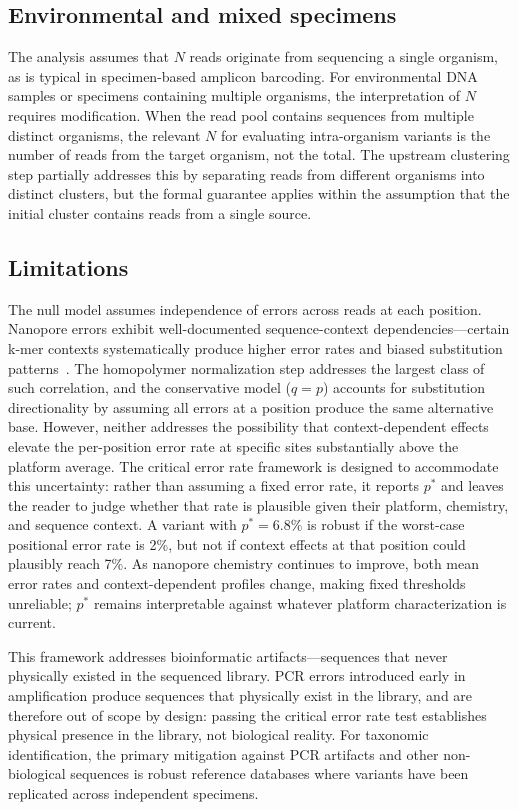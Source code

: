 \documentclass[11pt]{article}
\begin{document}
\subsection{Environmental and mixed specimens}

The analysis assumes that $N$ reads originate from sequencing a single organism,
as is typical in specimen-based amplicon barcoding. For environmental DNA samples
or specimens containing multiple organisms, the interpretation of $N$ requires
modification. When the read pool contains sequences from multiple distinct
organisms, the relevant $N$ for evaluating intra-organism variants is the number
of reads from the target organism, not the total. The upstream clustering step
partially addresses this by separating reads from different organisms into
distinct clusters, but the formal guarantee applies within the assumption that
the initial cluster contains reads from a single source.

\subsection{Limitations}

The null model assumes independence of errors across reads at each position.
Nanopore errors exhibit well-documented sequence-context dependencies---certain
k-mer contexts systematically produce higher error rates and biased substitution
patterns~\cite{delahaye2021}. The homopolymer normalization step addresses the
largest class of such correlation, and the conservative model ($q = p$) accounts
for substitution directionality by assuming all errors at a position produce the
same alternative base. However, neither addresses the possibility that
context-dependent effects elevate the per-position error rate at specific sites
substantially above the platform average. The critical error rate framework is
designed to accommodate this uncertainty: rather than assuming a fixed error
rate, it reports $p^*$ and leaves the reader to judge whether that rate is
plausible given their platform, chemistry, and sequence context. A variant with
$p^* = 6.8\%$ is robust if the worst-case positional error rate is 2\%, but not
if context effects at that position could plausibly reach 7\%. As nanopore
chemistry continues to improve, both mean error rates and context-dependent
profiles change, making fixed thresholds unreliable; $p^*$ remains interpretable
against whatever platform characterization is current.

This framework addresses bioinformatic artifacts---sequences that never
physically existed in the sequenced library. PCR errors introduced early in
amplification produce sequences that physically exist in the library, and are
therefore out of scope by design: passing the critical error rate test
establishes physical presence in the library, not biological reality. For
taxonomic identification, the primary mitigation against PCR artifacts and other
non-biological sequences is robust reference databases where variants have been
replicated across independent specimens.
\end{document}
